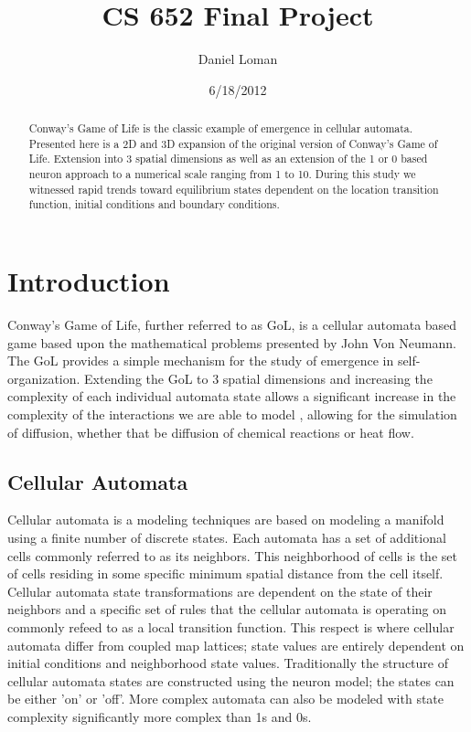 \documentclass[11pt,twocolumn]{article}
\title{\textbf{CS 652 Final Project }}
\author{Daniel Loman}
\date{6/18/2012}
\begin{document}
\maketitle
\begin{abstract}
Conway's Game of Life is the classic example of emergence in cellular automata. Presented here is a 2D and 3D expansion of the original version of Conway's Game of Life. Extension into 3 spatial dimensions as well as an extension of the 1 or 0 based neuron approach to a numerical scale ranging from 1 to 10. During this study we witnessed rapid trends toward equilibrium states dependent on the location transition function, initial conditions and boundary conditions.
\end{abstract}
\section{Introduction}
Conway's Game of Life, further referred to as GoL, is a cellular automata based game based upon the mathematical problems presented by John Von Neumann. The GoL provides a simple mechanism for the study of emergence in self-organization.\cite{arc02}
Extending the GoL to 3 spatial dimensions and increasing the complexity of each individual automata state allows a significant increase in the complexity of the interactions we are able to model
, allowing for the simulation of diffusion, whether that be diffusion of chemical reactions or heat flow.  
\subsection{Cellular Automata}
 Cellular automata is a modeling techniques are based on modeling a manifold 
 using a finite number of discrete states. 
 Each automata has a set of additional cells commonly referred to as its neighbors.\cite{boc} 
 This neighborhood of cells is the set of cells residing in some specific minimum spatial distance from the cell itself. 
 Cellular automata state transformations are dependent on the state of their neighbors and a specific set of rules that the cellular automata is operating on commonly refeed to as a local transition function.\cite{guinot}
 This respect is where cellular automata differ from coupled map lattices; state values are entirely dependent on initial conditions and neighborhood state values.
 Traditionally the structure of cellular automata states are constructed using the neuron model; the states can be either 'on' or 'off'. 
 More complex automata can also be modeled with state complexity significantly more complex than 1s and 0s.\cite{wolfram}
\end{document}

